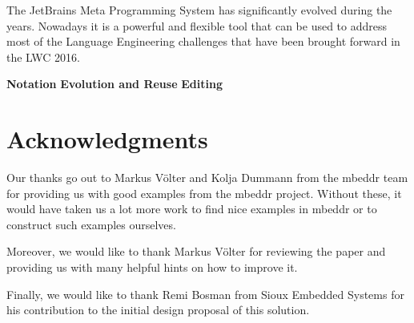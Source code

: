 \documentclass[preprint,numbers,10pt]{sigplanconf}
\begin{document}
The JetBrains Meta Programming System has significantly evolved during the years. Nowadays it is a powerful and flexible tool that can be used to address most of the Language Engineering challenges that have been brought forward in the LWC 2016.

\textbf{Notation}
\textbf{Evolution and Reuse}
\textbf{Editing}

\section{Acknowledgments}
Our thanks go out to Markus V\"olter and Kolja Dummann from the mbeddr team for providing us with good examples from the mbeddr project. Without these, it would have taken us a lot more work to find nice examples in mbeddr or to construct such examples ourselves.

Moreover, we would like to thank Markus V\"olter for reviewing the paper and providing us with many helpful hints on how to improve it.

Finally, we would like to thank Remi Bosman from Sioux Embedded Systems for his contribution to the initial design proposal of this solution.



\end{document}
